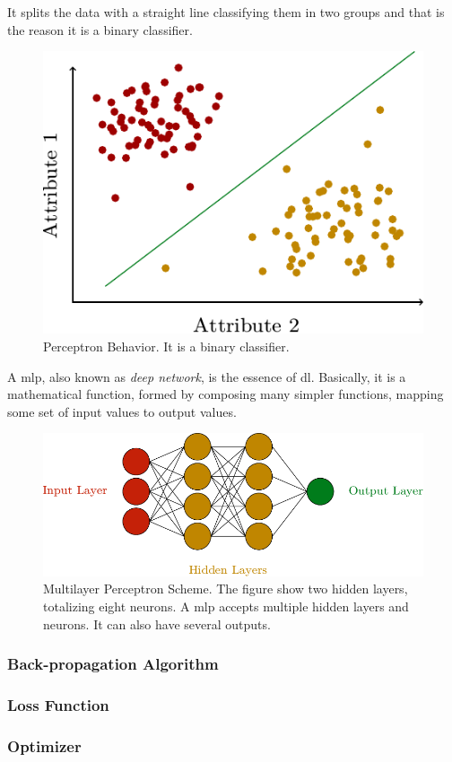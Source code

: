 It splits the data with a straight line classifying them in two groups and that is the reason it is a binary classifier.

\begin{figure}
    \centering
    \includegraphics{figures/2methodology/nn/perceptron_charge.pdf}
    \caption[Perceptron Behavior]{Perceptron Behavior. It is a binary classifier.}
\end{figure}
 
A \gls*{mlp}, also known as \emph{deep network}, is the essence of \gls*{dl}. Basically, it is a mathematical function, formed by composing many simpler functions, mapping some set of input values to output values.
%
\begin{figure}
    \centering
    \includegraphics{figures/2methodology/nn/mlp.pdf}
    \caption[Multilayer Perceptron Scheme]{Multilayer Perceptron Scheme. The figure show two hidden layers, totalizing eight neurons. A \gls*{mlp} accepts multiple hidden layers and neurons. It can also have several outputs.}
\end{figure}

\subsubsection*{Back-propagation Algorithm}

\subsubsection*{Loss Function}

\subsubsection*{Optimizer}